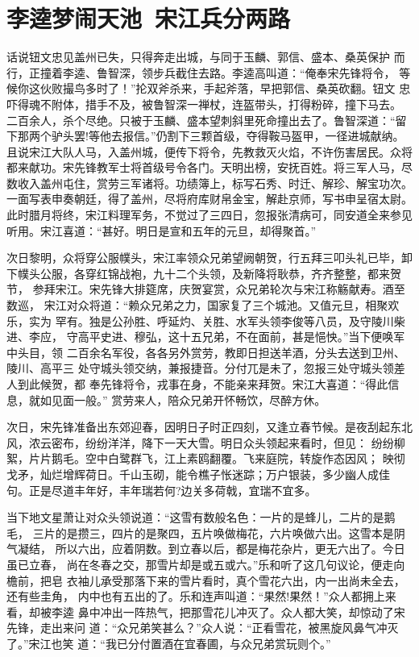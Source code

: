 \chapter{李逵梦闹天池~宋江兵分两路}

话说钮文忠见盖州已失，只得奔走出城，与同于玉麟、郭信、盛本、桑英保护
而行，正撞着李逵、鲁智深，领步兵截住去路。李逵高叫道：“俺奉宋先锋将令，
等候你这伙败撮鸟多时了！”抡双斧杀来，手起斧落，早把郭信、桑英砍翻。钮文
忠吓得魂不附体，措手不及，被鲁智深一禅杖，连盔带头，打得粉碎，撞下马去。
二百余人，杀个尽绝。只被于玉麟、盛本望刺斜里死命撞出去了。鲁智深道：“留
下那两个驴头罢!等他去报信。”仍割下三颗首级，夺得鞍马盔甲，一径进城献纳。
且说宋江大队人马，入盖州城，便传下将令，先教救灭火焰，不许伤害居民。众将
都来献功。宋先锋教军士将首级号令各门。天明出榜，安抚百姓。将三军人马，尽
数收入盖州屯住，赏劳三军诸将。功绩簿上，标写石秀、时迁、解珍、解宝功次。
一面写表申奏朝廷，得了盖州，尽将府库财帛金宝，解赴京师，写书申呈宿太尉。
此时腊月将终，宋江料理军务，不觉过了三四日，忽报张清病可，同安道全来参见
听用。宋江喜道：“甚好。明日是宣和五年的元旦，却得聚首。”

次日黎明，众将穿公服幞头，宋江率领众兄弟望阙朝贺，行五拜三叩头礼已毕，卸
下幞头公服，各穿红锦战袍，九十二个头领，及新降将耿恭，齐齐整整，都来贺节，
参拜宋江。宋先锋大排筵席，庆贺宴赏，众兄弟轮次与宋江称觞献寿。酒至数巡，
宋江对众将道：“赖众兄弟之力，国家复了三个城池。又值元旦，相聚欢乐，实为
罕有。独是公孙胜、呼延灼、关胜、水军头领李俊等八员，及守陵川柴进、李应，
守高平史进、穆弘，这十五兄弟，不在面前，甚是悒怏。”当下便唤军中头目，领
二百余名军役，各各另外赏劳，教即日担送羊酒，分头去送到卫州、陵川、高平三
处守城头领交纳，兼报捷音。分付兀是未了，忽报三处守城头领差人到此候贺，都
奉先锋将令，戎事在身，不能亲来拜贺。宋江大喜道：“得此信息，就如见面一般。”
赏劳来人，陪众兄弟开怀畅饮，尽醉方休。

次日，宋先锋准备出东郊迎春，因明日子时正四刻，又逢立春节候。是夜刮起东北
风，浓云密布，纷纷洋洋，降下一天大雪。明日众头领起来看时，但见：
纷纷柳絮，片片鹅毛。空中白鹭群飞，江上素鸥翻覆。飞来庭院，转旋作态因风；
映彻戈矛，灿烂增辉荷日。千山玉砌，能令樵子怅迷踪；万户银装，多少幽人成佳
句。正是尽道丰年好，丰年瑞若何?边关多荷戟，宜瑞不宜多。

当下地文星萧让对众头领说道：“这雪有数般名色：一片的是蜂儿，二片的是鹅毛，
三片的是攒三，四片的是聚四，五片唤做梅花，六片唤做六出。这雪本是阴气凝结，
所以六出，应着阴数。到立春以后，都是梅花杂片，更无六出了。今日虽已立春，
尚在冬春之交，那雪片却是或五或六。”乐和听了这几句议论，便走向檐前，把皂
衣袖儿承受那落下来的雪片看时，真个雪花六出，内一出尚未全去，还有些圭角，
内中也有五出的了。乐和连声叫道：“果然!果然！”众人都拥上来看，却被李逵
鼻中冲出一阵热气，把那雪花儿冲灭了。众人都大笑，却惊动了宋先锋，走出来问
道：“众兄弟笑甚么？”众人说：“正看雪花，被黑旋风鼻气冲灭了。”宋江也笑
道：“我已分付置酒在宜春圃，与众兄弟赏玩则个。”


